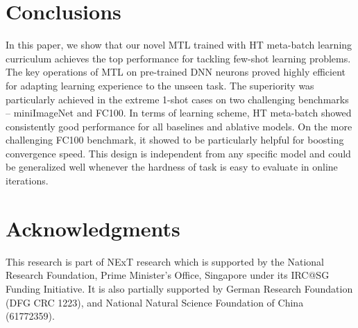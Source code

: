


\section{Conclusions}

In this paper, we show that our novel MTL trained with HT meta-batch learning curriculum achieves the top performance for tackling few-shot learning problems.
%
The key operations of MTL on pre-trained DNN neurons proved highly efficient for adapting learning experience to the unseen task.
The superiority was particularly achieved in the extreme 1-shot cases on two challenging benchmarks -- miniImageNet and FC100. 
%
In terms of learning scheme, HT meta-batch showed consistently good performance for all baselines and ablative models.
%
On the more challenging FC100 benchmark, it showed to be particularly helpful for boosting convergence speed.
%
This design is independent from any specific model and could be generalized well whenever the hardness of task is easy to evaluate in online iterations.

\section*{Acknowledgments}
This research is part of NExT research which is supported by the National Research Foundation, Prime Minister's Office, Singapore under its IRC@SG Funding Initiative.
It is also partially supported by German Research Foundation (DFG CRC 1223), and National Natural Science Foundation of China (61772359).
